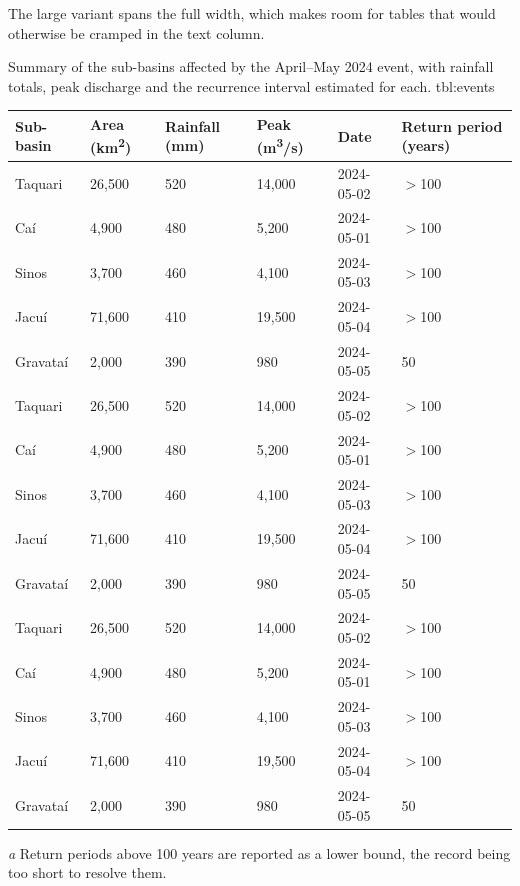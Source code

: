 The large variant spans the full width, which makes room for
tables that would otherwise be cramped in the text column.



\begin{TableL}{%
  Summary of the sub-basins affected by the April--May 2024
  event, with rainfall totals, peak discharge and the recurrence
  interval estimated for each.%
}{tbl:events}
\scriptsize
\sffamily
\begin{tabularx}{\linewidth}{LLLLLL}
\toprule
\textbf{Sub-basin} & \textbf{Area (km\textsuperscript{2})} &
\textbf{Rainfall (mm)} & \textbf{Peak (m\textsuperscript{3}/s)} &
\textbf{Date} & \textbf{Return period (years)} \\
\midrule
Taquari     &  26{,}500 & 520 & 14{,}000 & 2024-05-02 & $>$100 \\
Ca\'i       &   4{,}900 & 480 &  5{,}200 & 2024-05-01 & $>$100 \\
Sinos       &   3{,}700 & 460 &  4{,}100 & 2024-05-03 & $>$100 \\
Jacu\'i     &  71{,}600 & 410 & 19{,}500 & 2024-05-04 & $>$100 \\
Gravata\'i  &   2{,}000 & 390 &    980   & 2024-05-05 &    50  \\
Taquari     &  26{,}500 & 520 & 14{,}000 & 2024-05-02 & $>$100 \\
Ca\'i       &   4{,}900 & 480 &  5{,}200 & 2024-05-01 & $>$100 \\
Sinos       &   3{,}700 & 460 &  4{,}100 & 2024-05-03 & $>$100 \\
Jacu\'i     &  71{,}600 & 410 & 19{,}500 & 2024-05-04 & $>$100 \\
Gravata\'i  &   2{,}000 & 390 &    980   & 2024-05-05 &    50  \\
Taquari     &  26{,}500 & 520 & 14{,}000 & 2024-05-02 & $>$100 \\
Ca\'i       &   4{,}900 & 480 &  5{,}200 & 2024-05-01 & $>$100 \\
Sinos       &   3{,}700 & 460 &  4{,}100 & 2024-05-03 & $>$100 \\
Jacu\'i     &  71{,}600 & 410 & 19{,}500 & 2024-05-04 & $>$100 \\
Gravata\'i  &   2{,}000 & 390 &    980   & 2024-05-05 &    50  \\
\bottomrule
\end{tabularx}
\begin{tablenotes}
  \item[\textit{a}] Return periods above 100 years are reported as
  a lower bound, the record being too short to resolve them.
\end{tablenotes}
\end{TableL}




